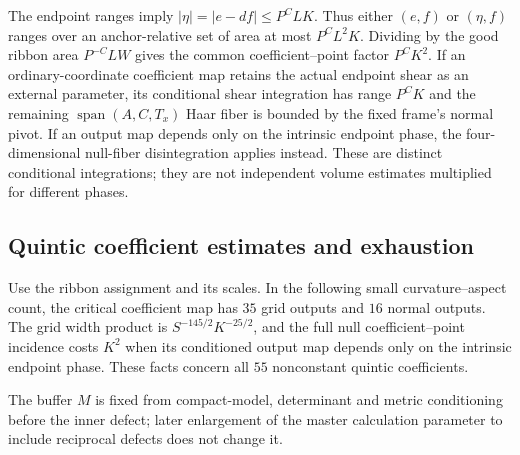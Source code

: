 \documentclass[11pt]{amsart}
\theoremstyle{definition}
\theoremstyle{remark}
\numberwithin{equation}{section}
\begin{document}
The endpoint ranges imply $|\eta|=|e-df|\le P^CLK$. Thus either $(e,f)$ or $(\eta,f)$ ranges over an anchor-relative set of area at most $P^CL^2K$. Dividing by the good ribbon area $P^{-C}LW$ gives the common coefficient--point factor $P^CK^2$. If an ordinary-coordinate coefficient map retains the actual endpoint shear as an external parameter, its conditional shear integration has range $P^CK$ and the remaining $\operatorname{span}(A,C,T_x)$ Haar fiber is bounded by the fixed frame's normal pivot. If an output map depends only on the intrinsic endpoint phase, the four-dimensional null-fiber disintegration applies instead. These are distinct conditional integrations; they are not independent volume estimates multiplied for different phases.

\subsection{Quintic coefficient estimates and exhaustion}\label{quintic:counts}\label{low:5:qsa:section}\label{low:5:qsa:reconstruction}\label{low:5:qsc:interfaces}\label{quintic:assembly}\label{low:5:qsc:exhaustion-section}\label{low:5:qga:actual-section}

Use the ribbon assignment and its scales. In the following small curvature--aspect count, the critical coefficient map has $35$ grid outputs and $16$ normal outputs. The grid width product is $S^{-145/2}K^{-25/2}$, and the full null coefficient--point incidence costs $K^2$ when its conditioned output map depends only on the intrinsic endpoint phase. These facts concern all $55$ nonconstant quintic coefficients.

The buffer $M$ is fixed from compact-model, determinant and metric conditioning before the inner defect; later enlargement of the master calculation parameter to include reciprocal defects does not change it.
\end{document}
